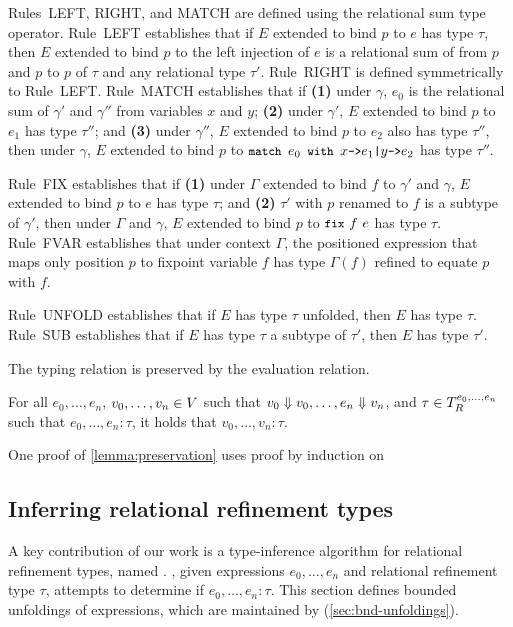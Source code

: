 Rules~LEFT, RIGHT, and MATCH are defined using the relational sum type
operator.
Rule~LEFT establishes that if $E$ extended to bind $p$ to $e$ has type
$\tau$, then $E$ extended to bind $p$ to the left injection of $e$ is
a relational sum of from $p$ and $p$ to $p$ of $\tau$ and any
relational type $\tau'$.
%
Rule~RIGHT is defined symmetrically to Rule~LEFT.
Rule~MATCH establishes that if %
\textbf{(1)} under $\gamma$, $e_0$ is the relational sum of $\gamma'$
and $\gamma''$ from variables $x$ and $y$;
% 
\textbf{(2)} under $\gamma'$, $E$ extended to bind $p$ to $e_1$ has
type $\tau''$; and
%
\textbf{(3)} under $\gamma''$, $E$ extended to bind $p$ to $e_2$ also
has type $\tau''$, then under $\gamma$, $E$ extended to bind $p$ to
$\matchexp{e_0}{x}{e_1}{y}{e_2}$ has type $\tau''$.

Rule~FIX establishes that if %
\textbf{(1)} under $\Gamma$ extended to bind $f$ to $\gamma'$ and
$\gamma$, $E$ extended to bind $p$ to $e$ has type $\tau$; and %
\textbf{(2)} $\tau'$ with $p$ renamed to $f$ is a subtype of
$\gamma'$, then under $\Gamma$ and $\gamma$, $E$ extended to bind $p$
to $\fix{f}{e}$ has type $\tau$.
Rule~FVAR establishes that under context $\Gamma$, the positioned
expression that maps only position $p$ to fixpoint variable $f$ has
type $\Gamma(f)$ refined to equate $p$ with $f$.

Rule~UNFOLD establishes that if $E$ has type $\tau$ unfolded,
then $E$ has type $\tau$.
Rule~SUB establishes that if $E$ has type $\tau$ a subtype of $\tau'$,
then $E$ has type $\tau'$.

The typing relation is preserved by the evaluation relation.
%
\begin{lemma}
  \label{lemma:preservation}
  For all $e_0, \ldots, e_n$, $v_0, \ldots, v_n \in V$ such that
  $v_0 \Downarrow v_0, \ldots, e_n \Downarrow v_n$, and
  $\tau \in T_{R}^{e_0, \ldots, e_n}$ such that
  $e_0, \ldots, e_n : \tau$, it holds that $v_0, \ldots, v_n : \tau$.
\end{lemma}
%
One proof of \autoref{lemma:preservation} uses proof by induction on
%

\subsection{Inferring relational refinement types}
\label{sec:infer}
%
A key contribution of our work is a type-inference algorithm for
relational refinement types, named \sys.
%
\sys, given expressions $e_0, \ldots, e_n$ and relational refinement
type $\tau$, attempts to determine if $e_0, \ldots, e_n : \tau$.
%
This section defines bounded unfoldings of expressions, which are
maintained by \sys (\autoref{sec:bnd-unfoldings}).


